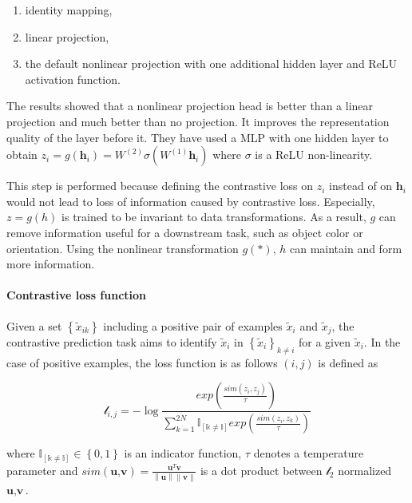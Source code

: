 \documentclass[
]{krantz}
\providecommand{\tightlist}{%
  \setlength{\itemsep}{0pt}\setlength{\parskip}{0pt}}
\begin{document}
\begin{enumerate}
\def\labelenumi{\arabic{enumi}.}
\tightlist
\item
  identity mapping,
\item
  linear projection,
\item
  the default nonlinear projection with one additional hidden layer and ReLU activation function.
\end{enumerate}

The results showed that a nonlinear projection head is better than a linear projection and much better than no projection. It improves the representation quality of the layer before it. They have used a MLP with one hidden layer to obtain \(z_i = g\left( \textbf{h}_i \right) = W^{\left( 2\right)}\sigma \left( W^{\left( 1\right)} \textbf{h}_i\right)\) where \(\sigma\) is a ReLU non-linearity.

This step is performed because defining the contrastive loss on \(z_i\) instead of on \(\textbf{h}_i\) would not lead to loss of information caused by contrastive loss. Especially, \(z=g\left( h \right)\) is trained to be invariant to data transformations. As a result, \(g\) can remove information useful for a downstream task, such as object color or orientation. Using the nonlinear transformation \(g\left( * \right)\), \(h\) can maintain and form more information.

\hypertarget{contrastive-loss-function}{%
\paragraph{Contrastive loss function}\label{contrastive-loss-function}}

Given a set \(\left\{ \tilde{x}_{ik} \right\}\) including a positive pair of examples \(\tilde{x}_{i}\) and \(\tilde{x}_{j}\), the contrastive prediction task aims to identify \(\tilde{x}_{i}\) in \(\left\{ \tilde{x}_{i} \right\}_{k\neq i}\) for a given \(\tilde{x}_{i}\). In the case of positive examples, the loss function is as follows \(\left( i, j\right)\) is defined as

\begin{equation}
\tag{7}
\mathcal{l}_{i,j} = −\log\frac{exp\left( \frac{sim(z_i,z_j)}{\tau} \right)}{\sum_{k=1}^{2N}\mathbb{I_{\left[ k\neq i \right]}}exp\left( \frac{sim(z_i,z_k)}{\tau} \right)}
\end{equation}

where \(\mathbb{I_{\left[ k\neq i \right]}}\in\left\{ 0,1 \right\}\) is an indicator function, \(\tau\) denotes a temperature parameter and \(sim\left(\textbf{u,v} \right)= \frac{\textbf{u}^T\textbf{v}}{\left\| \textbf{u}\right\|\left\| \textbf{v} \right\|}\) is a dot product between \(\mathcal{l}_2\) normalized \(\textbf{u},\textbf{v}\).
\end{document}
